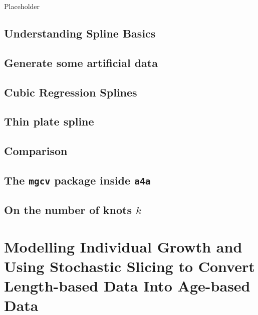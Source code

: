 \documentclass[
]{book}
\begin{document}
Placeholder

\hypertarget{understanding-spline-basics}{%
\section{Understanding Spline Basics}\label{understanding-spline-basics}}

\hypertarget{generate-some-artificial-data}{%
\section{Generate some artificial data}\label{generate-some-artificial-data}}

\hypertarget{cubic-regression-splines}{%
\section{Cubic Regression Splines}\label{cubic-regression-splines}}

\hypertarget{thin-plate-spline}{%
\section{Thin plate spline}\label{thin-plate-spline}}

\hypertarget{comparison}{%
\section{Comparison}\label{comparison}}

\hypertarget{the-mgcv-package-inside-a4a}{%
\section{\texorpdfstring{The \texttt{mgcv} package inside \texttt{a4a}}{The mgcv package inside a4a}}\label{the-mgcv-package-inside-a4a}}

\hypertarget{on-the-number-of-knots-k}{%
\section{\texorpdfstring{On the number of knots \(k\)}{On the number of knots k}}\label{on-the-number-of-knots-k}}

\hypertarget{modelling-individual-growth-and-using-stochastic-slicing-to-convert-length-based-data-into-age-based-data}{%
\chapter{Modelling Individual Growth and Using Stochastic Slicing to Convert Length-based Data Into Age-based Data}\label{modelling-individual-growth-and-using-stochastic-slicing-to-convert-length-based-data-into-age-based-data}}
\end{document}
